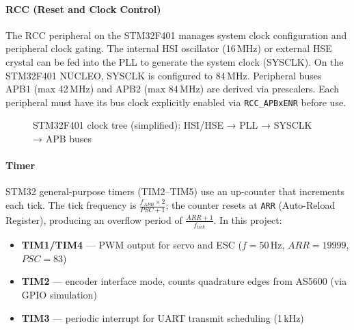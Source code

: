 \documentclass[12pt,a4paper]{article}
\begin{document}
\paragraph{RCC (Reset and Clock Control)}

The RCC peripheral on the STM32F401 manages system clock configuration and peripheral clock gating.
The internal HSI oscillator (16\,MHz) or external HSE crystal can be fed into the PLL to generate
the system clock (SYSCLK). On the STM32F401 NUCLEO, SYSCLK is configured to 84\,MHz.
Peripheral buses APB1 (max 42\,MHz) and APB2 (max 84\,MHz) are derived via prescalers.
Each peripheral must have its bus clock explicitly enabled via \texttt{RCC\_APBxENR} before use.

\begin{figure}[h]
\centering
{}
\caption{STM32F401 clock tree (simplified): HSI/HSE → PLL → SYSCLK → APB buses}
\end{figure}

\paragraph{Timer}

STM32 general-purpose timers (TIM2--TIM5) use an up-counter that increments each tick.
The tick frequency is \(\frac{f_{APB} \times 2}{PSC+1}\); the counter resets at \texttt{ARR} (Auto-Reload Register),
producing an overflow period of \(\frac{ARR+1}{f_{tick}}\).
In this project:
\begin{itemize}
  \item \textbf{TIM1/TIM4} — PWM output for servo and ESC (\(f=50\,\text{Hz}\), \(ARR=19999\), \(PSC=83\))
  \item \textbf{TIM2} — encoder interface mode, counts quadrature edges from AS5600 (via GPIO simulation)
  \item \textbf{TIM3} — periodic interrupt for UART transmit scheduling (1\,kHz)
\end{itemize}
\end{document}
